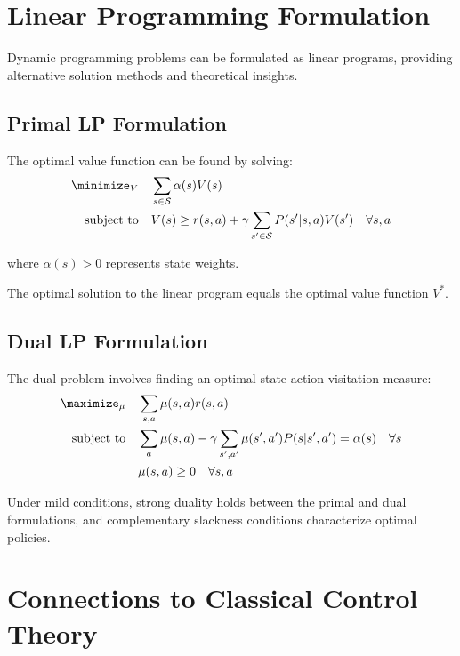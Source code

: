 \section{Linear Programming Formulation}

Dynamic programming problems can be formulated as linear programs, providing alternative solution methods and theoretical insights.

\subsection{Primal LP Formulation}

The optimal value function can be found by solving:
\begin{align}
\minimize_{V} \quad &\sum_{s \in \state} \alpha(s) V(s) \\
\text{subject to} \quad &V(s) \geq r(s,a) + \gamma \sum_{s' \in \state} P(s'|s,a) V(s') \quad \forall s,a
\end{align}

where $\alpha(s) > 0$ represents state weights.

\begin{theorem}[LP-DP Equivalence]
The optimal solution to the linear program equals the optimal value function $V^*$.
\end{theorem}

\subsection{Dual LP Formulation}

The dual problem involves finding an optimal state-action visitation measure:
\begin{align}
\maximize_{\mu} \quad &\sum_{s,a} \mu(s,a) r(s,a) \\
\text{subject to} \quad &\sum_a \mu(s,a) - \gamma \sum_{s',a'} \mu(s',a') P(s|s',a') = \alpha(s) \quad \forall s \\
&\mu(s,a) \geq 0 \quad \forall s,a
\end{align}

\begin{theorem}
Under mild conditions, strong duality holds between the primal and dual formulations, and complementary slackness conditions characterize optimal policies.
\end{theorem}

\section{Connections to Classical Control Theory}


